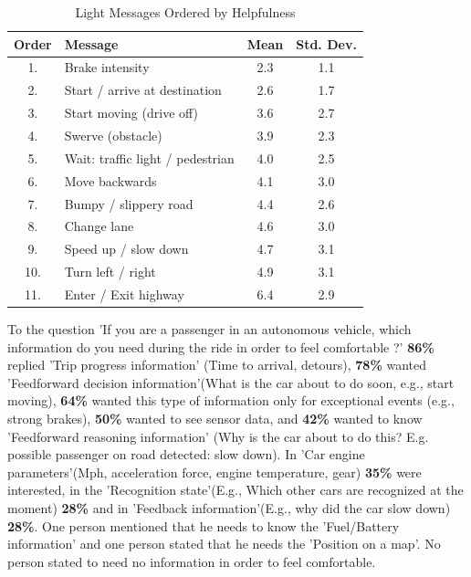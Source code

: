 \begin{table}
  \caption{Light Messages Ordered by Helpfulness}
  \label{tab:order}
  \begin{tabular}[t]{clcc}
    \toprule
    Order & Message & Mean & Std. Dev.\\
    \midrule
1.  & Brake intensity                     & 2.3 & 1.1 \\
2.  & Start / arrive  at destination       & 2.6 & 1.7 \\
3.  & Start moving (drive off)            & 3.6 & 2.7 \\
4.  & Swerve (obstacle)                   & 3.9 & 2.3 \\
5.  & Wait: traffic light / pedestrian & 4.0 & 2.5 \\
6.  & Move backwards                      & 4.1 & 3.0 \\
7.  & Bumpy  / slippery road               & 4.4 & 2.6 \\
8.  & Change lane                         & 4.6 & 3.0 \\
9.  & Speed up / slow down                & 4.7 & 3.1 \\
10. & Turn left / right                   & 4.9 & 3.1 \\
11. & Enter / Exit highway                & 6.4 & 2.9
\end{tabular}
\end{table}

To the question 'If you are a passenger in an autonomous vehicle, which information do you need during the ride in order to feel comfortable ?' 
\textbf{86\%} replied 'Trip progress information' (Time to arrival, detours), \textbf{78\%} wanted 'Feedforward decision information'(What is the car about to do soon, e.g., start moving), \textbf{64\%} wanted this type of information only for exceptional events (e.g., strong brakes), \textbf{50\%} wanted to see sensor data, and \textbf{42\%} wanted to know 'Feedforward reasoning information' (Why is the car about to do this? E.g. possible passenger on road detected: slow down). In 'Car engine parameters'(Mph, acceleration force, engine temperature, gear) \textbf{35\%} were interested, in the 'Recognition state'(E.g., Which other cars are recognized at the moment) \textbf{28\%} and in 'Feedback information'(E.g., why did the car slow down) \textbf{28\%}. One person mentioned that he needs to know the 'Fuel/Battery information' and one person stated that he needs the 'Position on a map'. No person stated to need no information in order to feel comfortable. 

